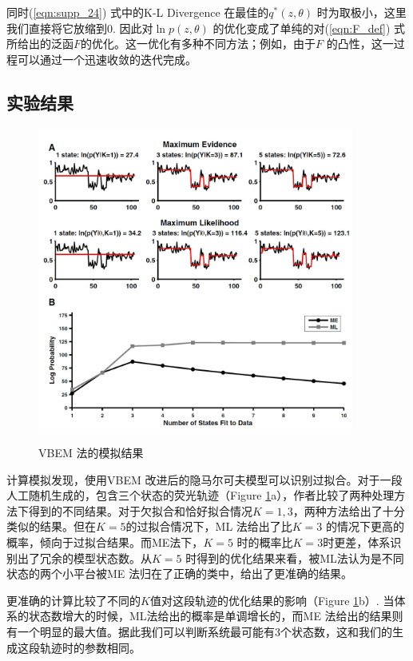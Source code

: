 \documentclass[11pt, a4paper]{article}
\begin{document}
    同时(\ref{eqn:supp_24}) 式中的K-L Divergence 在最佳的$q^*(z,\theta)$ 时为取极小，这里我们直接将它放缩到0. 因此对$\ln p(z,\theta)$ 的优化变成了单纯的对(\ref{eqn:F_def}) 式所给出的泛函$F$的优化。这一优化有多种不同方法；例如，由于$F$ 的凸性，这一过程可以通过一个迅速收敛的迭代完成。

    \subsection{实验结果}
    \begin{figure}[htb]
      \centering
      \includegraphics[height=10cm]{fig_vbms.jpg}\\
      \caption{VBEM 法的模拟结果}
      \label{fig:vbem}
    \end{figure}

    计算模拟发现，使用VBEM 改进后的隐马尔可夫模型可以识别过拟合。对于一段人工随机生成的，包含三个状态的荧光轨迹（Figure \ref{fig:vbem}a），作者比较了两种处理方法下得到的不同结果。对于欠拟合和恰好拟合情况$K=1, 3$，两种方法给出了十分类似的结果。但在$K=5$的过拟合情况下，ML 法给出了比$K=3$ 的情况下更高的概率，倾向于过拟合结果。而ME法下，$K=5$ 时的概率比$K=3$时更差，体系识别出了冗余的模型状态数。从$K=5$ 时得到的优化结果来看，被ML法认为是不同状态的两个小平台被ME 法归在了正确的类中，给出了更准确的结果。

    更准确的计算比较了不同的$K$值对这段轨迹的优化结果的影响（Figure \ref{fig:vbem}b）. 当体系的状态数增大的时候，ML法给出的概率是单调增长的，而ME 法给出的结果则有一个明显的最大值。据此我们可以判断系统最可能有3个状态数，这和我们的生成这段轨迹时的参数相同。
\end{document}
